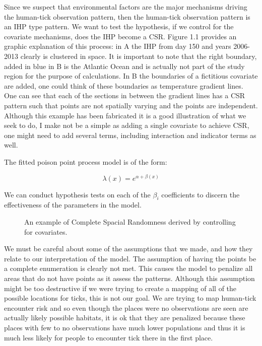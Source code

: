 \noindent Since we suspect that environmental factors are the major mechanisms driving the human-tick observation pattern, then the human-tick observation pattern is an IHP type pattern. We want to test the hypothesis, if we control for the covariate mechanisms, does the IHP become a CSR. Figure 1.1 provides an graphic explanation of this process: in A the IHP from day 150 and years 2006-2013 clearly is clustered in space. It is important to note that the right boundary, added in blue in B is the Atlantic Ocean and is actually not part of the study region for the purpose of calculations. In B the boundaries of a fictitious covariate are added, one could think of these boundaries as temperature gradient lines. One can see that each of the sections in between the gradient lines has a CSR pattern such that points are not spatially varying and the points are independent. Although this example has been fabricated it is a good illustration of what we seek to do, I make not be a simple as adding a single covariate to achieve CSR, one might need to add several terms, including interaction and indicator terms as well.\newline
 
 
\noindent The fitted poison point process model is of the form:

\begin{equation}
\lambda(x) = e^{\alpha +\beta(x)}
\end{equation}

\noindent We can conduct hypothesis tests on each of the $\beta_i$ coefficients to discern the effectiveness of the parameters in the model. \newline


\begin{figure} [t]
\centerline{}
\caption{An example of Complete Spacial Randomness derived by controlling for covariates. }
\label{fig6}
\end{figure}

\noindent We must be careful about some of the assumptions that we made, and how they relate to our interpretation of the model. The assumption of having the points be a complete enumeration is clearly not met. This causes the model to penalize all areas that do not have points as it assess the patterns. Although this assumption might be too destructive if we were trying to create a mapping of all of the possible locations for ticks, this is not our goal. We are trying to map human-tick encounter risk and so even though the places were no observations are seen are actually likely possible habitats, it is ok that they are penalized because these places with few to no observations have much lower populations and thus it is much less likely for people to encounter tick there in the first place.\newline


